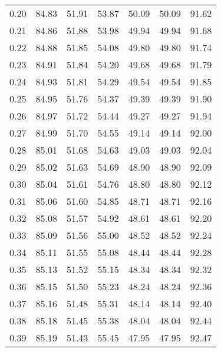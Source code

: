 \begin{tabular}{|c|c|c|c|c|c|c|}
      0.20 &     84.83 &     51.91 &      53.87 &   50.09 &      50.09 &         91.62 \\
      0.21 &     84.86 &     51.88 &      53.98 &   49.94 &      49.94 &         91.68 \\
      0.22 &     84.88 &     51.85 &      54.08 &   49.80 &      49.80 &         91.74 \\
      0.23 &     84.91 &     51.84 &      54.20 &   49.68 &      49.68 &         91.79 \\
      0.24 &     84.93 &     51.81 &      54.29 &   49.54 &      49.54 &         91.85 \\
      0.25 &     84.95 &     51.76 &      54.37 &   49.39 &      49.39 &         91.90 \\
      0.26 &     84.97 &     51.72 &      54.44 &   49.27 &      49.27 &         91.94 \\
      0.27 &     84.99 &     51.70 &      54.55 &   49.14 &      49.14 &         92.00 \\
      0.28 &     85.01 &     51.68 &      54.63 &   49.03 &      49.03 &         92.04 \\
      0.29 &     85.02 &     51.63 &      54.69 &   48.90 &      48.90 &         92.09 \\
      0.30 &     85.04 &     51.61 &      54.76 &   48.80 &      48.80 &         92.12 \\
      0.31 &     85.06 &     51.60 &      54.85 &   48.71 &      48.71 &         92.16 \\
      0.32 &     85.08 &     51.57 &      54.92 &   48.61 &      48.61 &         92.20 \\
      0.33 &     85.09 &     51.56 &      55.00 &   48.52 &      48.52 &         92.24 \\
      0.34 &     85.11 &     51.55 &      55.08 &   48.44 &      48.44 &         92.28 \\
      0.35 &     85.13 &     51.52 &      55.15 &   48.34 &      48.34 &         92.32 \\
      0.36 &     85.15 &     51.50 &      55.23 &   48.24 &      48.24 &         92.36 \\
      0.37 &     85.16 &     51.48 &      55.31 &   48.14 &      48.14 &         92.40 \\
      0.38 &     85.18 &     51.45 &      55.38 &   48.04 &      48.04 &         92.44 \\
      0.39 &     85.19 &     51.43 &      55.45 &   47.95 &      47.95 &         92.47 \\

\end{tabular}
